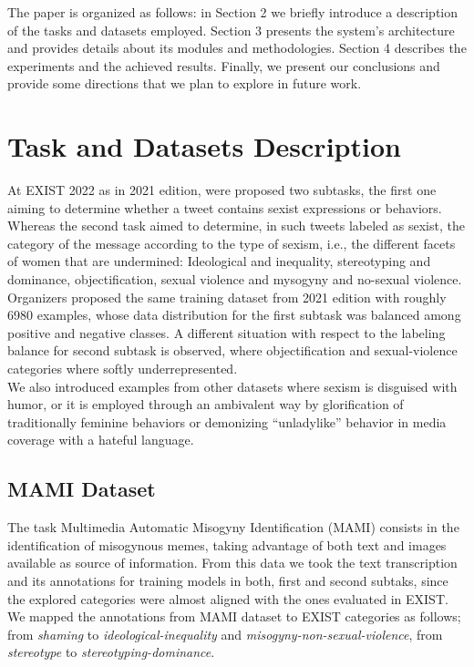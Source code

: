 \documentclass[
]{ceurart}
\begin{document}
The paper is organized as follows: in Section 2 we briefly introduce a description of the tasks and datasets employed. Section 3 presents the system’s architecture and provides details about its modules and methodologies. Section 4 describes the experiments and the achieved results. Finally, we present our
conclusions and provide some directions that we plan to explore in future work.

\section{Task and Datasets Description }

At EXIST 2022 as in 2021 edition, were proposed two subtasks, the first one aiming to determine whether a tweet contains sexist expressions or behaviors. Whereas the second task aimed to determine, in such tweets labeled as sexist, the category of the message according to the type of sexism, i.e., the different facets of women that are undermined: Ideological and inequality, stereotyping and dominance, objectification, sexual violence and mysogyny and no-sexual violence.
\\
Organizers proposed the same training dataset from 2021 edition with roughly 6980 examples, whose data distribution for the first subtask was balanced among positive and negative classes. A different situation with respect to the labeling balance for second subtask is observed, where objectification and sexual-violence categories where softly underrepresented.
\\
We also introduced examples from other datasets where sexism is disguised with humor, or it is employed through an ambivalent way by glorification  of traditionally feminine behaviors or demonizing “unladylike” behavior in media coverage with a hateful language.

\subsection{MAMI Dataset}

The task Multimedia Automatic Misogyny Identification (MAMI) \cite{task5} consists in the identification of misogynous memes, taking advantage of both text and images available as source of information. From this data we took the text transcription and its annotations for training models in both, first and second subtaks, since the explored categories were almost aligned with the ones evaluated in EXIST. We mapped the annotations from MAMI dataset to EXIST categories as follows; from \textit{shaming}  to \textit{ideological-inequality} and \textit{misogyny-non-sexual-violence}, from \textit{stereotype} to \textit{stereotyping-dominance}.
\end{document}
